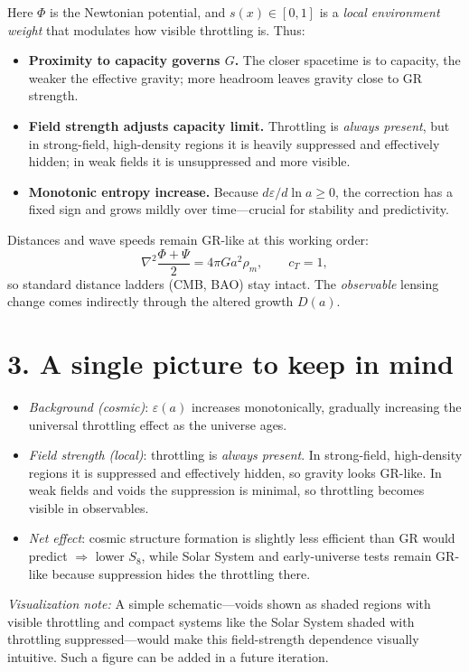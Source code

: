 \documentclass[aps,prd,onecolumn,superscriptaddress,nofootinbib]{revtex4-2}
\newcommand{\eps}{\varepsilon}
\begin{document}
Here $\Phi$ is the Newtonian potential, and $s(x)\!\in[0,1]$ is a \emph{local environment weight} that modulates how visible throttling is. Thus:
\begin{itemize}
\item \textbf{Proximity to capacity governs $G$.} The closer spacetime is to capacity, the weaker the effective gravity; more headroom leaves gravity close to GR strength.
\item \textbf{Field strength adjusts capacity limit.} Throttling is \emph{always present}, but in strong-field, high-density regions it is heavily suppressed and effectively hidden; in weak fields it is unsuppressed and more visible.
\item \textbf{Monotonic entropy increase.} Because $d\eps/d\ln a\!\ge\!0$, the correction has a fixed sign and grows mildly over time---crucial for stability and predictivity.
\end{itemize}

Distances and wave speeds remain GR-like at this working order:
\[
\nabla^2\frac{\Phi+\Psi}{2}=4\pi G a^2\rho_m, \qquad c_T=1,
\]
so standard distance ladders (CMB, BAO) stay intact. The \emph{observable} lensing change comes indirectly through the altered growth $D(a)$.

\section*{3. A single picture to keep in mind}
\begin{itemize}
\item \emph{Background (cosmic)}: $\varepsilon(a)$ increases monotonically, gradually increasing the universal throttling effect as the universe ages.
\item \emph{Field strength (local)}: throttling is \emph{always present}. In strong-field, high-density regions it is suppressed and effectively hidden, so gravity looks GR-like. In weak fields and voids the suppression is minimal, so throttling becomes visible in observables.
\item \emph{Net effect}: cosmic structure formation is slightly less efficient than GR would predict $\Rightarrow$ lower $S_8$, while Solar System and early-universe tests remain GR-like because suppression hides the throttling there.
\end{itemize}

\medskip
\noindent\emph{Visualization note:} A simple schematic---voids shown as shaded regions with visible throttling and compact systems like the Solar System shaded with throttling suppressed---would make this field-strength dependence visually intuitive. Such a figure can be added in a future iteration.
\end{document}
